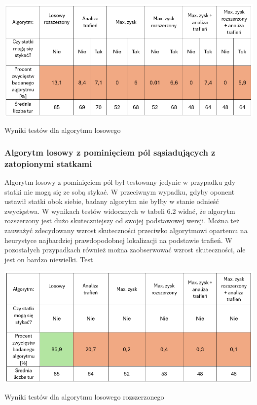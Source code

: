 \begin{table}[!h]
    \centering
    \includegraphics[width=1\linewidth]{img/table-random.png}
    \caption{Wyniki testów dla algorytmu losowego}
\end{table}

\subsubsection{Algorytm losowy z pominięciem pól sąsiadujących z zatopionymi statkami}

Algorytm losowy z pominięciem pól był testowany jedynie w przypadku gdy statki nie mogą się ze sobą stykać. W przeciwnym wypadku, gdyby oponent ustawił statki obok siebie, badany algorytm nie byłby w stanie odnieść zwycięstwa. W wynikach testów widocznych w tabeli 6.2 widać, że algorytm rozszerzony jest dużo skuteczniejszy od swojej podstawowej wersji. Można też zauważyć zdecydowany wzrost skuteczności przeciwko algorytmowi opartemu na heurystyce najbardziej prawdopodobnej lokalizacji na podstawie trafień. W pozostałych przypadkach również można zaobserwować wzrost skuteczności, ale jest on bardzo niewielki.
Test

\begin{table}[!h]
    \centering
    \includegraphics[width=1\linewidth]{img/table-random-plus.png}
    \caption{Wyniki testów dla algorytmu losowego rozszerzonego}
\end{table}

